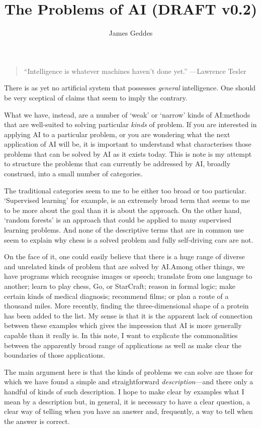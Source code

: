 \documentclass[10pt, a4paper, twocolumn]{article}
\title{The Problems of AI (DRAFT v0.2)}
\author{James Geddes}
\begin{document}
\maketitle
\begin{quote}
``Intelligence is whatever machines haven't done yet.'' ---Lawrence Tesler
\end{quote}
There is as yet no artificial system that possesses \emph{general}
intelligence. One should be very sceptical of claims that seem to imply the
contrary.

What we have, instead, are a number of `weak' or `narrow' kinds of AI:\@ methods
that are well-suited to solving particular \emph{kinds} of problem. If you are
interested in applying AI to a particular problem, or you are wondering what the
next application of AI will be, it is important to understand what characterises
those problems that can be solved by AI as it exists today. This is note is my
attempt to structure the problems that can currently be addressed by AI, broadly
construed, into a small number of categories.

The traditional categories seem to me to be either too broad or too
particular. `Supervised learning' for example, is an extremely broad term that
seems to me to be more about the goal than it is about the approach. On the
other hand, `random forests' is an approach that could be applied to many
supervised learning problems. And none of the descriptive terms that are in
common use seem to explain why chess is a solved problem and fully self-driving
cars are not. 

On the face of it, one could easily believe that there is a huge range of
diverse and unrelated kinds of problem that are solved by AI.\@ Among other
things, we have programs which recognise images or speech; translate from one
language to another; learn to play chess, Go, or StarCraft; reason in formal
logic; make certain kinds of medical diagnosis; recommend films; or plan a route
of a thousand miles. More recently, finding the three-dimensional shape of a
protein has been added to the list. My sense is that it is the apparent lack of
connection between these examples which gives the impression that AI is more
generally capable than it really is. In this note, I want to explicate the
commonalities between the apparently broad range of applications as well as make
clear the boundaries of those applications.

The main argument here is that the kinds of problems we can solve are those for
which we have found a simple and straightforward \emph{description}---and there
only a handful of kinds of such description. I hope to make clear by examples
what I mean by a description but, in general, it is necessary to have a clear
question, a clear way of telling when you have an answer and, frequently, a way
to tell when the answer is correct.
\end{document}
